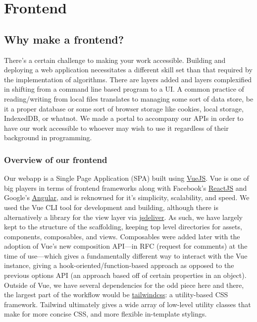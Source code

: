 \documentclass[11pt, twoside, reqno]{book}
\begin{document}
\startmain
\chapter{Frontend}

\section{Why make a frontend?}

There's a certain challenge to making your work accessible. Building and deploying a web application necessitates a different skill set than that required by the implementation of algorithms. There are layers added and layers complexified in shifting from a command line based program to a UI. A common practice of reading/writing from local files translates to managing some sort of data store, be it a proper database or some sort of browser storage like cookies, local storage, IndexedDB, or whatnot. We made a portal to accompany our APIs in order to have our work accessible to whoever may wish to use it regardless of their background in programming.

\subsection{Overview of our frontend}

Our webapp is a Single Page Application (SPA) built using \href{https://vuejs.org/}{VueJS}. Vue is one of big players in terms of frontend frameworks along with Facebook's \href{https://reactjs.org/}{ReactJS} and Google's \href{https://angular.io/}{Angular}, and is reknowned for it's simplicity, scalability, and speed. We used the Vue CLI tool for development and building, although there is alternatively a library for the view layer via \href{https://cdn.jsdelivr.net/npm/vue/dist/vue.js}{jsdeliver}. As such, we have largely kept to the structure of the scaffolding, keeping top level directories for assets, components, composables, and views. Composables were added later with the adoption of Vue's new composition API—in RFC (request for comments) at the time of use—which gives a fundamentally different way to interact with the Vue instance, giving a hook-oriented/function-based approach as opposed to the previous options API (an approach based off of certain properties in an object). Outside of Vue, we have several dependencies for the odd piece here and there, the largest part of the workflow would be \href{https://tailwindcss.com/}{tailwindcss}: a utility-based CSS framework. Tailwind ultimately gives a wide array of low-level utility classes that make for more concise CSS, and more flexible in-template stylings.
\end{document}

